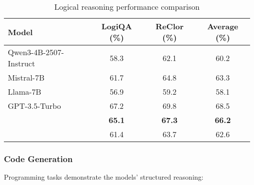 \begin{table}[H]
\centering
\begin{tabular}{lccc}
\toprule
Model & LogiQA (\%) & ReClor (\%) & Average (\%) \\
\midrule
Qwen3-4B-2507-Instruct & 58.3 & 62.1 & 60.2 \\
Mistral-7B & 61.7 & 64.8 & 63.3 \\
Llama-7B & 56.9 & 59.2 & 58.1 \\
GPT-3.5-Turbo & 67.2 & 69.8 & 68.5 \\
\midrule
\textbf{\supra{}} & \textbf{65.1} & \textbf{67.3} & \textbf{66.2} \\
\textbf{\zennano{}} & 61.4 & 63.7 & 62.6 \\
\bottomrule
\end{tabular}
\caption{Logical reasoning performance comparison}
\label{tab:logic-results}
\end{table}

\subsubsection{Code Generation}

Programming tasks demonstrate the models' structured reasoning:


